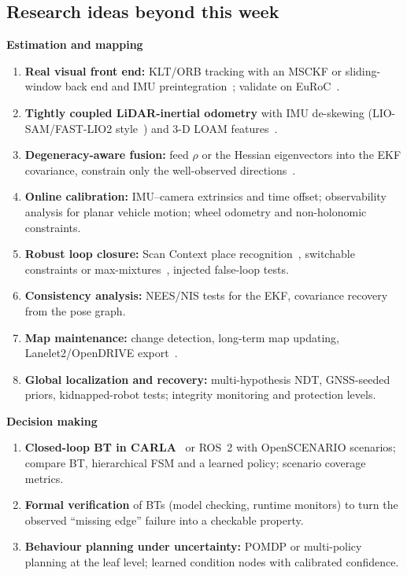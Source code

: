\documentclass[11pt,a4paper]{article}
\begin{document}
\subsection{Research ideas beyond this week}
\textbf{Estimation and mapping}
\begin{enumerate}[series=ideas,label=\textbf{I\arabic*.},leftmargin=2.4em]
\item \textbf{Real visual front end:} KLT/ORB tracking with an MSCKF or sliding-window back end and IMU preintegration~\cite{mourikis07,forster17}; validate on EuRoC~\cite{burri16}.
\item \textbf{Tightly coupled LiDAR-inertial odometry} with IMU de-skewing (LIO-SAM/FAST-LIO2 style~\cite{shan20,xu22}) and 3-D LOAM features~\cite{zhang14}.
\item \textbf{Degeneracy-aware fusion:} feed $\rho$ or the Hessian eigenvectors into the EKF covariance, constrain only the well-observed directions~\cite{zhang16}.
\item \textbf{Online calibration:} IMU--camera extrinsics and time offset; observability analysis for planar vehicle motion; wheel odometry and non-holonomic constraints.
\item \textbf{Robust loop closure:} Scan Context place recognition~\cite{kim18}, switchable constraints or max-mixtures~\cite{sunderhauf12}, injected false-loop tests.
\item \textbf{Consistency analysis:} NEES/NIS tests for the EKF, covariance recovery from the pose graph.
\item \textbf{Map maintenance:} change detection, long-term map updating, Lanelet2/OpenDRIVE export~\cite{poggenhans18}.
\item \textbf{Global localization and recovery:} multi-hypothesis NDT, GNSS-seeded priors, kidnapped-robot tests; integrity monitoring and protection levels.
\end{enumerate}
\textbf{Decision making}
\begin{enumerate}[resume*=ideas]
\item \textbf{Closed-loop BT in CARLA}~\cite{dosovitskiy17} or ROS~2 with OpenSCENARIO scenarios; compare BT, hierarchical FSM and a learned policy; scenario coverage metrics.
\item \textbf{Formal verification} of BTs (model checking, runtime monitors) to turn the observed ``missing edge'' failure into a checkable property.
\item \textbf{Behaviour planning under uncertainty:} POMDP or multi-policy planning at the leaf level; learned condition nodes with calibrated confidence.
\end{enumerate}
\end{document}
